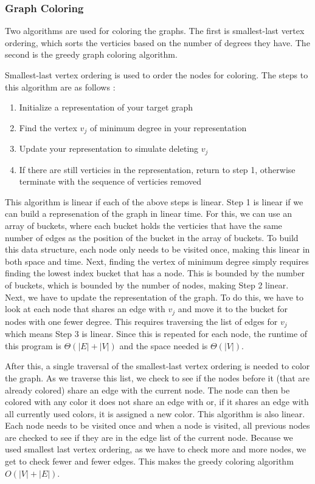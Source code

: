 \documentclass{article}
\begin{document}
        \subsubsection{Graph Coloring}
        Two algorithms are used for coloring the graphs. The first is smallest-last vertex ordering, which sorts the verticies based on the number of degrees they have. The second is the greedy graph coloring algorithm.
        \par
        Smallest-last vertex ordering is used to order the nodes for coloring. The steps to this algorithm are as follows \cite{slv}:

        \begin{enumerate}
            \item Initialize a representation of your target graph
            \item Find the vertex $v_j$ of minimum degree in your representation
            \item Update your representation to simulate deleting $v_j$
            \item If there are still verticies in the representation, return to step 1, otherwise terminate with the sequence of verticies removed
        \end{enumerate}

        This algorithm is linear if each of the above steps is linear. Step 1 is linear if we can build a represenation of the graph in linear time. For this, we can use an array of buckets, where each bucket holds the verticies that have the same number of edges as the position of the bucket in the array of buckets. To build this data structure, each node only needs to be visited once, making this linear in both space and time. Next, finding the vertex of minimum degree simply requires finding the lowest index bucket that has a node. This is bounded by the number of buckets, which is bounded by the number of nodes, making Step 2 linear. Next, we have to update the representation of the graph. To do this, we have to look at each node that shares an edge with $v_j$ and move it to the bucket for nodes with one fewer degree. This requires traversing the list of edges for $v_j$ which means Step 3 is linear. Since this is repeated for each node, the runtime of this program is $\Theta\left(|E| + |V|\right)$ and the space needed is $\Theta(|V|)$.
        \par
        After this, a single traversal of the smallest-last vertex ordering is needed to color the graph. As we traverse this list, we check to see if the nodes before it (that are already colored) share an edge with the current node. The node can then be colored with any color it does not share an edge with or, if it shares an edge with all currently used colors, it is assigned a new color. This algorithm is also linear. Each node needs to be visited once and when a node is visited, all previous nodes are checked to see if they are in the edge list of the current node. Because we used smallest last vertex ordering, as we have to check more and more nodes, we get to check fewer and fewer edges. This makes the greedy coloring algorithm $O(|V| + |E|)$.
\end{document}
